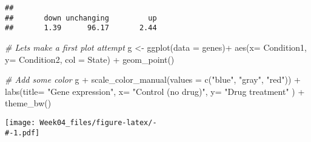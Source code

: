 \documentclass[
]{article}
\newenvironment{Shaded}{\begin{snugshade}}{\end{snugshade}}
\newcommand{\AttributeTok}[1]{\textcolor[rgb]{0.77,0.63,0.00}{#1}}
\newcommand{\CommentTok}[1]{\textcolor[rgb]{0.56,0.35,0.01}{\textit{#1}}}
\newcommand{\FunctionTok}[1]{\textcolor[rgb]{0.00,0.00,0.00}{#1}}
\newcommand{\NormalTok}[1]{#1}
\newcommand{\OtherTok}[1]{\textcolor[rgb]{0.56,0.35,0.01}{#1}}
\newcommand{\SpecialCharTok}[1]{\textcolor[rgb]{0.00,0.00,0.00}{#1}}
\newcommand{\StringTok}[1]{\textcolor[rgb]{0.31,0.60,0.02}{#1}}
\begin{document}
\begin{verbatim}
## 
##       down unchanging         up 
##       1.39      96.17       2.44
\end{verbatim}

\begin{Shaded}
\begin{Highlighting}[]
\CommentTok{\# Let\textquotesingle{}s make a first plot attempt}
\NormalTok{g }\OtherTok{\textless{}{-}} \FunctionTok{ggplot}\NormalTok{(}\AttributeTok{data =}\NormalTok{ genes)}\SpecialCharTok{+}
  \FunctionTok{aes}\NormalTok{(}\AttributeTok{x=}\NormalTok{ Condition1, }\AttributeTok{y=}\NormalTok{ Condition2, }\AttributeTok{col =}\NormalTok{ State) }\SpecialCharTok{+}
  \FunctionTok{geom\_point}\NormalTok{()}

\CommentTok{\# Add some color }
\NormalTok{g }\SpecialCharTok{+} \FunctionTok{scale\_color\_manual}\NormalTok{(}\AttributeTok{values =} \FunctionTok{c}\NormalTok{(}\StringTok{"blue"}\NormalTok{, }\StringTok{"gray"}\NormalTok{, }\StringTok{"red"}\NormalTok{)) }\SpecialCharTok{+}
  \FunctionTok{labs}\NormalTok{(}\AttributeTok{title=} \StringTok{"Gene expression"}\NormalTok{, }\AttributeTok{x=} \StringTok{"Control (no drug)"}\NormalTok{, }\AttributeTok{y=} \StringTok{"Drug treatment"}\NormalTok{ ) }\SpecialCharTok{+}
  \FunctionTok{theme\_bw}\NormalTok{()}
\end{Highlighting}
\end{Shaded}

\texttt{[image: Week04\_files/figure-latex/-\\\#-1.pdf]}
\end{document}
